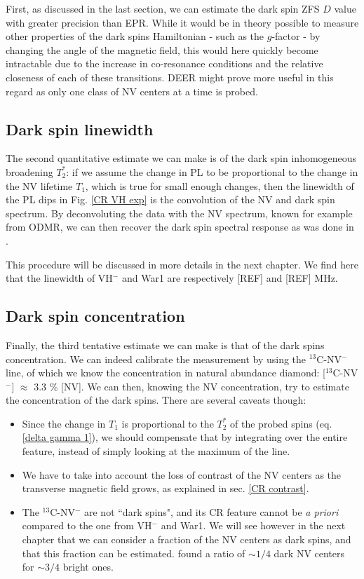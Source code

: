 \documentclass[a4paper,11pt]{report}
\begin{document}
\begin{refsection}
First, as discussed in the last section, we can estimate the dark spin ZFS $D$ value with greater precision than EPR. While it would be in theory possible to measure other properties of the dark spins Hamiltonian - such as the $g$-factor - by changing the angle of the magnetic field, this would here quickly become intractable due to the increase in co-resonance conditions and the relative closeness of each of these transitions. DEER might prove more useful in this regard as only one class of NV centers at a time is probed.

\subsection{Dark spin linewidth}

The second quantitative estimate we can make is of the dark spin inhomogeneous broadening $T_2^*$: if we assume the change in PL to be proportional to the change in the NV lifetime $T_1$, which is true for small enough changes, then the linewidth of the PL dips in Fig. \ref{CR VH exp} is the convolution of the NV and dark spin spectrum. By deconvoluting the data with the NV spectrum, known for example from ODMR, we can then recover the dark spin spectral response as was done in \citep{hall2016detection}. 

This procedure will be discussed in more details in the next chapter. We find here that the linewidth of VH$^-$ and War1 are respectively [REF] and [REF] MHz.

\subsection{Dark spin concentration}

Finally, the third tentative estimate we can make is that of the dark spins concentration. We can indeed calibrate the measurement by using the $^{13}$C-NV$^-$ line, of which we know the concentration in natural abundance diamond: [$^{13}$C-NV$^-$] $\approx$ 3.3 \% [NV]. We can then, knowing the NV concentration, try to estimate the concentration of the dark spins. There are several caveats though:

\begin{itemize}
\item Since the change in $T_1$ is proportional to the $T_2^*$ of the probed spins (eq. \ref{delta gamma 1}), we should compensate that by integrating over the entire feature, instead of simply looking at the maximum of the line.
\item We have to take into account the loss of contrast of the NV centers as the transverse magnetic field grows, as explained in sec. \ref{CR contrast}.
\item The $^{13}$C-NV$^-$ are not ``dark spins", and its CR feature cannot be \textit{a priori} compared to the one from VH$^-$ and War1. We will see however in the next chapter that we can consider a fraction of the NV centers as dark spins, and that this fraction can be estimated. \citep{choi2017depolarization} found a ratio of $\sim 1/4$ dark NV centers for $\sim 3/4$ bright ones.
\end{itemize}


\end{refsection}
\end{document}

